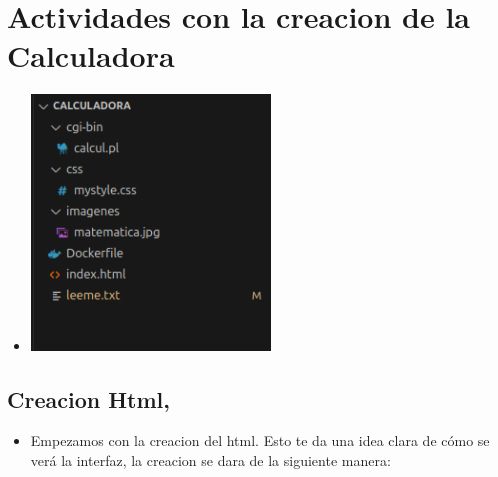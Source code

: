\documentclass{article}
\begin{document}
	\section{Actividades con la creacion de la Calculadora}
            \begin{itemize}
                \item [] \includegraphics[width=0.5\textwidth]{Lab5/latex/img/Carpetas.png}
            \end{itemize}
	
	\subsection{Creacion Html,}
	\begin{itemize}
        \item Empezamos con la creacion del html. Esto te da una idea clara de cómo se       verá la interfaz, la creacion se dara de la siguiente manera:
        \end{itemize}
	
\end{document}
